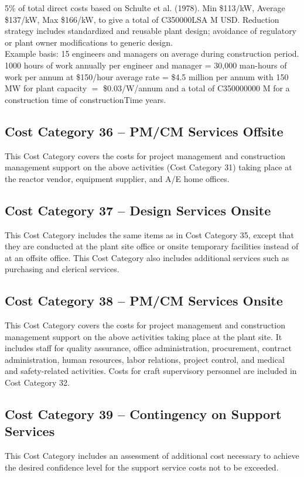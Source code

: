 5\% of total direct costs based on Schulte et al. (1978). Min \$113/kW, Average \$137/kW, Max
\$166/kW, to give a total of C350000LSA M USD.  Reduction strategy includes standardized and reusable plant design; avoidance of regulatory or
plant owner modifications to generic design.\\


Example basis: 15 engineers and managers on average during construction period.
1000 hours of work annually per engineer and manager = 30,000 man-hours of work per
annum at \$150/hour average rate = \$4.5 million per annum with 150 MW for plant capacity $=$ \$0.03/W/annum and a total of C350000000 M for a construction time of constructionTime years.


\subsection*{Cost Category 36 – PM/CM Services Offsite}
This Cost Category covers the costs for project management and construction management support on the above activities (Cost Category 31) taking place at the reactor vendor, equipment supplier, and A/E home offices.

\subsection*{Cost Category 37 – Design Services Onsite}
This Cost Category includes the same items as in Cost Category 35, except that they are conducted at the plant site office or onsite temporary facilities instead of at an offsite office. This Cost Category also includes additional services such as purchasing and clerical services.

\subsection*{Cost Category 38 – PM/CM Services Onsite}
This Cost Category covers the costs for project management and construction management support on the above activities taking place at the plant site. It includes staff for quality assurance, office administration, procurement, contract administration, human resources, labor relations, project control, and medical and safety-related activities. Costs for craft supervisory personnel are included in Cost Category 32.

\subsection*{Cost Category 39 – Contingency on Support Services}
This Cost Category includes an assessment of additional cost necessary to achieve the desired confidence level for the support service costs not to be exceeded.

